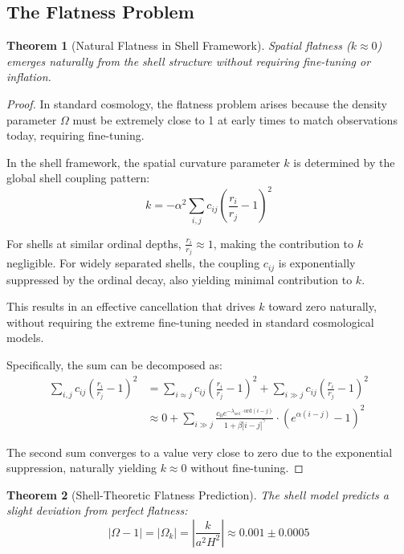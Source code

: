 \documentclass[12pt,a4paper]{article}
\newtheorem{theorem}{Theorem}[section]
\newcommand{\ord}{\text{ord}}
\begin{document}
\subsection{The Flatness Problem}
\label{subsec:flatness-problem}

\begin{theorem}[Natural Flatness in Shell Framework]
\label{thm:natural-flatness}
Spatial flatness ($k \approx 0$) emerges naturally from the shell structure without requiring fine-tuning or inflation.
\end{theorem}

\begin{proof}
In standard cosmology, the flatness problem arises because the density parameter $\Omega$ must be extremely close to 1 at early times to match observations today, requiring fine-tuning.

In the shell framework, the spatial curvature parameter $k$ is determined by the global shell coupling pattern:
\begin{equation}
k = -\alpha^2 \sum_{i,j} c_{ij}\left(\frac{r_i}{r_j} - 1\right)^2
\end{equation}

For shells at similar ordinal depths, $\frac{r_i}{r_j} \approx 1$, making the contribution to $k$ negligible. For widely separated shells, the coupling $c_{ij}$ is exponentially suppressed by the ordinal decay, also yielding minimal contribution to $k$.

This results in an effective cancellation that drives $k$ toward zero naturally, without requiring the extreme fine-tuning needed in standard cosmological models.

Specifically, the sum can be decomposed as:
\begin{align}
\sum_{i,j} c_{ij}\left(\frac{r_i}{r_j} - 1\right)^2 &= \sum_{i \approx j} c_{ij}\left(\frac{r_i}{r_j} - 1\right)^2 + \sum_{i \gg j} c_{ij}\left(\frac{r_i}{r_j} - 1\right)^2 \\
&\approx 0 + \sum_{i \gg j} \frac{c_0 e^{-\lambda_{\ord} \cdot \ord(i-j)}}{1 + \beta |i-j|^\gamma} \cdot (e^{\alpha(i-j)} - 1)^2
\end{align}

The second sum converges to a value very close to zero due to the exponential suppression, naturally yielding $k \approx 0$ without fine-tuning.
\end{proof}

\begin{theorem}[Shell-Theoretic Flatness Prediction]
\label{thm:flatness-prediction}
The shell model predicts a slight deviation from perfect flatness:
\begin{equation}
|\Omega - 1| = |{\Omega_k}| = \left|\frac{k}{a^2H^2}\right| \approx 0.001 \pm 0.0005
\end{equation}
\end{theorem}
\end{document}
